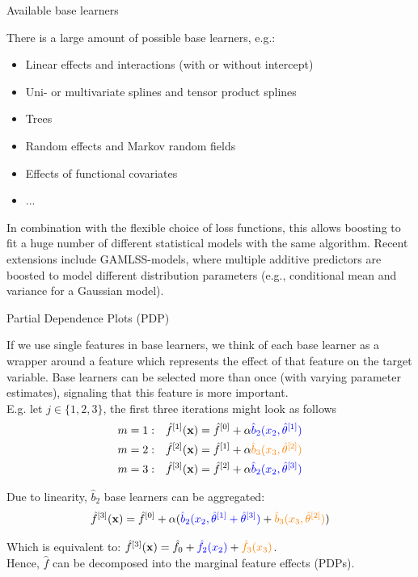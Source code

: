 \documentclass[11pt,compress,t,notes=noshow, xcolor=table]{beamer}
\begin{document}
\begin{vbframe}{Available base learners}

There is a large amount of possible base learners, e.g.:

\begin{itemize}
  \item Linear effects and interactions (with or without intercept)
  \item Uni- or multivariate splines and tensor product splines
  \item Trees
  \item Random effects and Markov random fields
  \item Effects of functional covariates
  \item ...
\end{itemize}

\lz

In combination with the flexible choice of loss functions, this allows boosting to fit  a huge number of different statistical models with the same algorithm. Recent extensions include GAMLSS-models, where multiple additive predictors are boosted to model different distribution parameters (e.g., conditional mean and variance for a Gaussian model).

\end{vbframe}
\begin{vbframe}{Partial Dependence Plots (PDP)}

If we use single features in base learners, we think of each base learner as a wrapper around a feature which represents the effect of that feature on the target variable. Base learners can be selected more than once (with varying parameter estimates), signaling that this feature is more important.\\
E.g. let $j \in \{ 1,2,3 \}$, the first three iterations might look as follows
\begin{align*}
m = 1: \quad & \hat{f}^{[1]}(\mathbf{x}) = \hat{f}^{[0]} + \alpha \textcolor{blue}{\hat{b}_2(x_2, \hat{\theta}^{[1]})}\\
m = 2: \quad & \hat{f}^{[2]}(\mathbf{x}) = \hat{f}^{[1]} + \alpha  \textcolor{orange}{\hat{b}_3(x_3, \hat{\theta}^{[2]})}\\
m = 3: \quad & \hat{f}^{[3]}(\mathbf{x}) = \hat{f}^{[2]} + \alpha \textcolor{blue}{\hat{b}_2(x_2, \hat{\theta}^{[3]})}
\end{align*}

Due to linearity, $\hat{b}_2$ base learners can be aggregated:
$$
\hat{f}^{[3]}(\mathbf{x}) = \hat{f}^{[0]} + \alpha (\textcolor{blue}{\hat{b}_2(x_2, \hat{\theta}^{[1]} + \hat{\theta}^{[3]})} + \textcolor{orange}{\hat{b}_3(x_3, \hat{\theta}^{[2]})})
$$

Which is equivalent to:
$\hat{f}^{[3]}(\mathbf{x}) = \hat{f}_0 + \textcolor{blue}{\hat{f}_2(x_2)} + \textcolor{orange}{\hat{f}_3(x_3)}$.\\
Hence, $\hat{f}$ can be decomposed into the marginal feature effects (PDPs).



\end{vbframe}
\end{document}
